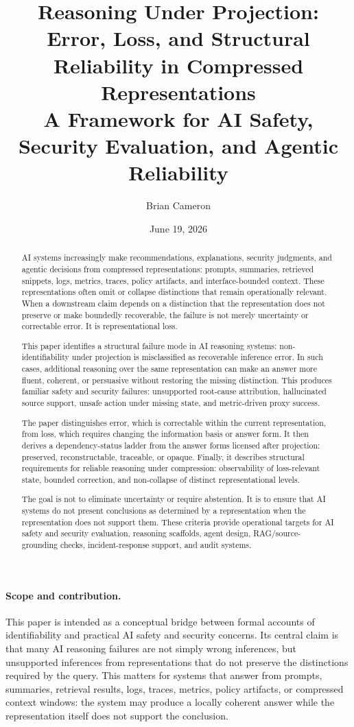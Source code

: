 \documentclass[11pt]{article}
\title{Reasoning Under Projection:\\
Error, Loss, and Structural Reliability in Compressed Representations\\
\large A Framework for AI Safety, Security Evaluation, and Agentic Reliability}
\author{Brian Cameron}
\date{June 19, 2026}
\begin{document}
\maketitle

\begin{abstract}
AI systems increasingly make recommendations, explanations, security judgments, and agentic decisions from compressed representations: prompts, summaries, retrieved snippets, logs, metrics, traces, policy artifacts, and interface-bounded context. These representations often omit or collapse distinctions that remain operationally relevant. When a downstream claim depends on a distinction that the representation does not preserve or make boundedly recoverable, the failure is not merely uncertainty or correctable error. It is representational loss.

This paper identifies a structural failure mode in AI reasoning systems: non-identifiability under projection is misclassified as recoverable inference error. In such cases, additional reasoning over the same representation can make an answer more fluent, coherent, or persuasive without restoring the missing distinction. This produces familiar safety and security failures: unsupported root-cause attribution, hallucinated source support, unsafe action under missing state, and metric-driven proxy success.

The paper distinguishes error, which is correctable within the current representation, from loss, which requires changing the information basis or answer form. It then derives a dependency-status ladder from the answer forms licensed after projection: preserved, reconstructable, traceable, or opaque. Finally, it describes structural requirements for reliable reasoning under compression: observability of loss-relevant state, bounded correction, and non-collapse of distinct representational levels.

The goal is not to eliminate uncertainty or require abstention. It is to ensure that AI systems do not present conclusions as determined by a representation when the representation does not support them. These criteria provide operational targets for AI safety and security evaluation, reasoning scaffolds, agent design, RAG/source-grounding checks, incident-response support, and audit systems.
\end{abstract}

\paragraph{Scope and contribution.}
This paper is intended as a conceptual bridge between formal accounts of identifiability and practical AI safety and security concerns. Its central claim is that many AI reasoning failures are not simply wrong inferences, but unsupported inferences from representations that do not preserve the distinctions required by the query. This matters for systems that answer from prompts, summaries, retrieval results, logs, traces, metrics, policy artifacts, or compressed context windows: the system may produce a locally coherent answer while the representation itself does not support the conclusion.
\end{document}
